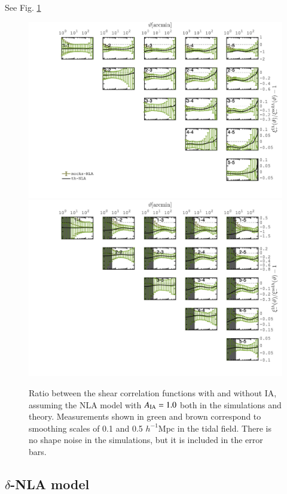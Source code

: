 \documentclass[useAMS,usenatbib]{mn2e}
\begin{document}
See Fig. \ref{fig:xi_NLA}
\begin{figure}
\includegraphics[width=\columnwidth]{graphs/frac_xip_IA1_skysim_NLA_srd.jpg}
\includegraphics[width=\columnwidth]{graphs/frac_xim_IA1_skysim_NLA_srd.jpg}
\caption{Ratio between the shear correlation functions with and without IA, assuming the NLA model with $A_{\rm IA}=1.0$ both in the simulations and theory. Measurements shown in green and brown correspond to smoothing scales of 0.1 and 0.5 $h^{-1}$Mpc in the tidal field. There is no shape noise in the simulations, but it is included in the error bars.}
\label{fig:xi_NLA}
\end{figure}


\subsection{$\delta$-NLA model}
\label{subsec:deltaNLA}
\end{document}
